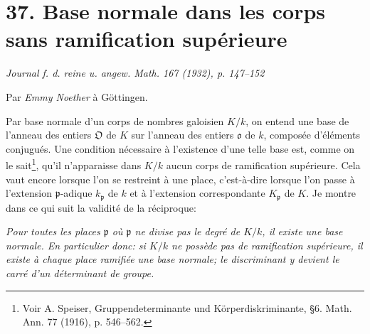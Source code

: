 \section*{37. Base normale dans les corps sans ramification supérieure}

\begin{center}
\emph{Journal f. d. reine u. angew. Math. 167 (1932), p. 147--152}
\end{center}

\begin{center}
Par \emph{Emmy Noether} à Göttingen.
\end{center}

Par base normale d'un corps de nombres galoisien \(K/k\), on entend une base de l'anneau des entiers \(\mathfrak{O}\) de \(K\) sur l'anneau des entiers \(\mathfrak{o}\) de \(k\), composée d'éléments conjugués. Une condition nécessaire à l'existence d'une telle base est, comme on le sait\footnote{Voir A. Speiser, Gruppendeterminante und Körperdiskriminante, \S 6. Math. Ann. 77 (1916), p. 546--562.}, qu'il n'apparaisse dans \(K/k\) aucun corps de ramification supérieure. Cela vaut encore lorsque l'on se restreint à une place, c'est-à-dire lorsque l'on passe à l'extension \(\mathfrak{p}\)-adique \(k_{\mathfrak{p}}\) de \(k\) et à l'extension correspondante \(K_{\mathfrak{p}}\) de \(K\). Je montre dans ce qui suit la validité de la réciproque:

\emph{Pour toutes les places \(\mathfrak{p}\) où \(\mathfrak{p}\) ne divise pas le degré de \(K/k\), il existe une base normale. En particulier donc: si \(K/k\) ne possède pas de ramification supérieure, il existe à chaque place ramifiée une base normale; le discriminant y devient le carré d'un déterminant de groupe.}

